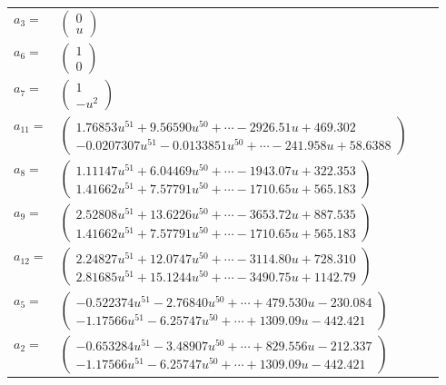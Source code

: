\documentclass[1p]{elsarticle_modified}
\theoremstyle{definition}
\begin{document}
\begin{tabular}{m{7pt} m{180pt} m{7pt} m{180pt} }
\flushright $a_{3}=$&$\begin{pmatrix}0\\u\end{pmatrix}$ \\
\flushright $a_{6}=$&$\begin{pmatrix}1\\0\end{pmatrix}$ \\
\flushright $a_{7}=$&$\begin{pmatrix}1\\- u^2\end{pmatrix}$ \\
\flushright $a_{11}=$&$\begin{pmatrix}1.76853 u^{51}+9.56590 u^{50}+\cdots-2926.51 u+469.302\\-0.0207307 u^{51}-0.0133851 u^{50}+\cdots-241.958 u+58.6388\end{pmatrix}$ \\
\flushright $a_{8}=$&$\begin{pmatrix}1.11147 u^{51}+6.04469 u^{50}+\cdots-1943.07 u+322.353\\1.41662 u^{51}+7.57791 u^{50}+\cdots-1710.65 u+565.183\end{pmatrix}$ \\
\flushright $a_{9}=$&$\begin{pmatrix}2.52808 u^{51}+13.6226 u^{50}+\cdots-3653.72 u+887.535\\1.41662 u^{51}+7.57791 u^{50}+\cdots-1710.65 u+565.183\end{pmatrix}$ \\
\flushright $a_{12}=$&$\begin{pmatrix}2.24827 u^{51}+12.0747 u^{50}+\cdots-3114.80 u+728.310\\2.81685 u^{51}+15.1244 u^{50}+\cdots-3490.75 u+1142.79\end{pmatrix}$ \\
\flushright $a_{5}=$&$\begin{pmatrix}-0.522374 u^{51}-2.76840 u^{50}+\cdots+479.530 u-230.084\\-1.17566 u^{51}-6.25747 u^{50}+\cdots+1309.09 u-442.421\end{pmatrix}$ \\
\flushright $a_{2}=$&$\begin{pmatrix}-0.653284 u^{51}-3.48907 u^{50}+\cdots+829.556 u-212.337\\-1.17566 u^{51}-6.25747 u^{50}+\cdots+1309.09 u-442.421\end{pmatrix}$ \\

\end{tabular}
\end{document}
